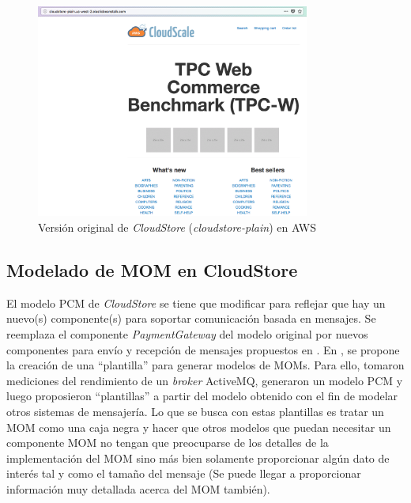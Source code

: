 \documentclass[conference]{IEEEtran}
\begin{document}
\begin{figure}[h]
  \centering
  \includegraphics[width=9cm]{aws-cs-plain}
  \caption{\small{Versión original de \emph{CloudStore} (\emph{cloudstore-plain}) en AWS}}
  \label{fig:aws-cs-plain}
\end{figure}

\subsection{Modelado de MOM en CloudStore} \label{sec:cloudstore-mom}
El modelo PCM de \emph{CloudStore} se tiene que modificar para reflejar que hay un nuevo(s) componente(s) para soportar comunicación basada en mensajes. Se reemplaza el componente \emph{PaymentGateway} del modelo original por nuevos componentes para envío y recepción de mensajes propuestos en \cite{happe-et-al}. En \cite{happe-et-al}, se propone la creación de una ``plantilla'' para generar modelos de MOMs. Para ello, tomaron mediciones del rendimiento de un \emph{broker} ActiveMQ, generaron un modelo PCM y luego proposieron ``plantillas'' a partir del modelo obtenido con el fin de modelar otros sistemas de mensajería. Lo que se busca con estas plantillas es tratar un MOM como una caja negra y hacer que otros modelos que puedan necesitar un componente MOM no tengan que preocuparse de los detalles de la implementación del MOM sino más bien solamente proporcionar algún dato de interés tal y como el tamaño del mensaje (Se puede llegar a proporcionar información muy detallada acerca del MOM también).
\end{document}
